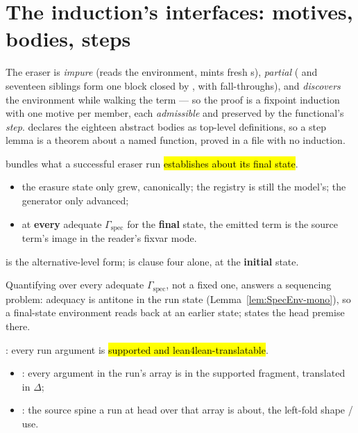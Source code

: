 \section{The induction's interfaces: motives, bodies, steps}
\label{sec:refinement:motives}

The eraser is \emph{impure} (reads the environment, mints fresh s), \emph{partial}
( and seventeen siblings form one  block closed by ,
with  fall-throughs), and \emph{discovers} the environment while walking the term --- so the
proof is a fixpoint induction with one motive per member, each \emph{admissible} and preserved by the
functional's \emph{step}.  declares the eighteen abstract bodies as top-level
definitions, so a step lemma is a theorem about a named function, proved in a file with no induction.

\begin{definition}
\label{def:RunRefines}
\leanok
{}
  bundles what a successful eraser run \hl{establishes about its final
state}.
\begin{itemize}
\item the erasure state only grew, canonically; the registry is still the model's; the generator only
advanced;
\item at \textbf{every} adequate $\Gamma_{\mathrm{spec}}$ for the \textbf{final} state, the emitted term
is the source term's image in the reader's fixvar mode.
\end{itemize}
  is the alternative-level form;  is clause four alone,
at the \textbf{initial} state.
\end{definition}

\begin{remark}
 Quantifying over every adequate $\Gamma_{\mathrm{spec}}$, not a fixed one, answers a
sequencing problem: adequacy is antitone in the run state (Lemma~\ref{lem:SpecEnv-mono}), so a
final-state environment reads back at an earlier state;  states the head premise there.
\end{remark}

\begin{definition}
\label{def:ArgsOk}
\leanok
{}
 : every run argument is \hl{supported and lean4lean-translatable}.
\begin{itemize}
\item {}: every argument in the run's array is in the supported fragment, translated in
$\Delta$;
\item {}: the source spine a run at head  over that array is about, the
left-fold shape / use.
\end{itemize}
\end{definition}

